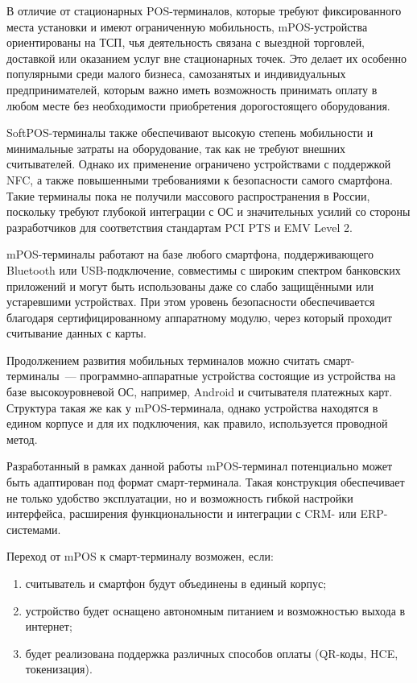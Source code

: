 В отличие от стационарных POS-терминалов, которые требуют фиксированного места установки и имеют ограниченную мобильность, mPOS-устройства ориентированы на ТСП, чья деятельность связана с выездной торговлей, доставкой или оказанием услуг вне стационарных точек.
Это делает их особенно популярными среди малого бизнеса, самозанятых и индивидуальных предпринимателей, которым важно иметь возможность принимать оплату в любом месте без необходимости приобретения дорогостоящего оборудования.

SoftPOS-терминалы также обеспечивают высокую степень мобильности и минимальные затраты на оборудование, так как не требуют внешних считывателей.
Однако их применение ограничено устройствами с поддержкой NFC, а также повышенными требованиями к безопасности самого смартфона.
Такие терминалы пока не получили массового распространения в России, поскольку требуют глубокой интеграции с ОС и значительных усилий со стороны разработчиков для соответствия стандартам PCI PTS и EMV Level 2.

mPOS-терминалы работают на базе любого смартфона, поддерживающего Bluetooth или USB-подключение, совместимы с широким спектром банковских приложений и могут быть использованы даже со слабо защищёнными или устаревшими устройствах.
При этом уровень безопасности обеспечивается благодаря сертифицированному аппаратному модулю, через который проходит считывание данных с карты.

Продолжением развития мобильных терминалов можно считать смарт-терминалы~--- программно-аппаратные устройства состоящие из устройства на базе высокоуровневой ОС, например, Android и считывателя платежных карт.
Структура такая же как у mPOS-терминала, однако устройства находятся в едином корпусе и для их подключения, как правило, используется проводной метод.

Разработанный в рамках данной работы mPOS-терминал потенциально может быть адаптирован под формат смарт-терминала.
Такая конструкция обеспечивает не только удобство эксплуатации, но и возможность гибкой настройки интерфейса, расширения функциональности и интеграции с CRM- или ERP-системами.

Переход от mPOS к смарт-терминалу возможен, если:

\begin{enumerate}
    \item считыватель и смартфон будут объединены в единый корпус;
    \item устройство будет оснащено автономным питанием и возможностью выхода в интернет;
    \item будет реализована поддержка различных способов оплаты (QR-коды, HCE, токенизация).
\end{enumerate}

